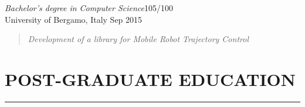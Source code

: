 \documentclass[10pt]{article}
\newcommand{\cvsection}[1]{\section*{\centering\normalsize\uppercase{#1}}\vspace{-16pt}\rule{\linewidth}{0.2pt}}
\begin{document}
\vspace{6pt} %

\textit{Bachelor's degree in Computer Science}\hfill 105\slash100\\
University of Bergamo, Italy \hfill Sep 2015
\vspace{-3pt}
\begin{quote}
	\textit{Development of a library for Mobile Robot Trajectory Control}
\end{quote}

\clearpage

\cvsection{post-graduate education}
\end{document}
